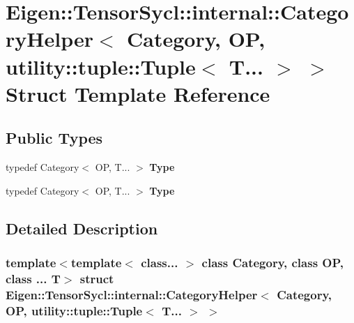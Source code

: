 \hypertarget{struct_eigen_1_1_tensor_sycl_1_1internal_1_1_category_helper_3_01_category_00_01_o_p_00_01utilit485e974ddbafa51856a66c82ba2b607a}{}\section{Eigen\+:\+:Tensor\+Sycl\+:\+:internal\+:\+:Category\+Helper$<$ Category, OP, utility\+:\+:tuple\+:\+:Tuple$<$ T... $>$ $>$ Struct Template Reference}
\label{struct_eigen_1_1_tensor_sycl_1_1internal_1_1_category_helper_3_01_category_00_01_o_p_00_01utilit485e974ddbafa51856a66c82ba2b607a}
\subsection*{Public Types}
\begin{DoxyCompactItemize}
\item 
\mbox{\label{struct_eigen_1_1_tensor_sycl_1_1internal_1_1_category_helper_3_01_category_00_01_o_p_00_01utilit485e974ddbafa51856a66c82ba2b607a_a0d639ab296b087f83763dea34eb06937}} 
typedef Category$<$ OP, T... $>$ {\bfseries Type}
\item 
\mbox{\label{struct_eigen_1_1_tensor_sycl_1_1internal_1_1_category_helper_3_01_category_00_01_o_p_00_01utilit485e974ddbafa51856a66c82ba2b607a_a0d639ab296b087f83763dea34eb06937}} 
typedef Category$<$ OP, T... $>$ {\bfseries Type}
\end{DoxyCompactItemize}


\subsection{Detailed Description}
\subsubsection*{template$<$template$<$ class... $>$ class Category, class OP, class ... T$>$\newline
struct Eigen\+::\+Tensor\+Sycl\+::internal\+::\+Category\+Helper$<$ Category, O\+P, utility\+::tuple\+::\+Tuple$<$ T... $>$ $>$}



